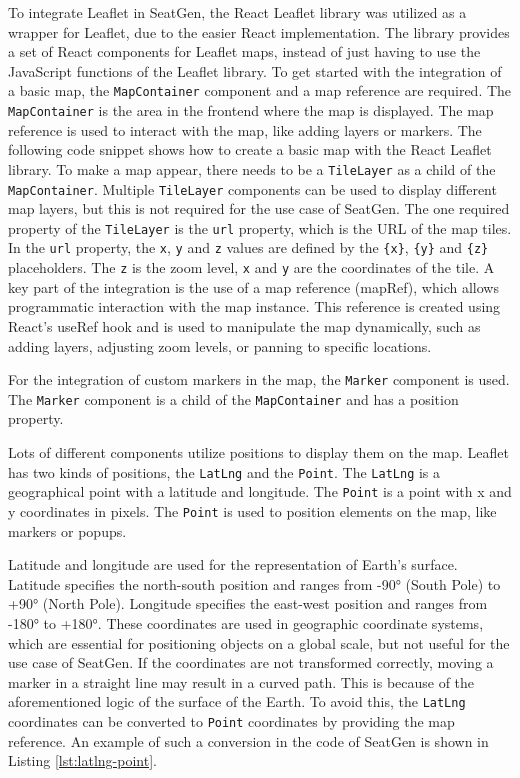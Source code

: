 To integrate Leaflet\cite{LeafletGitHub} in SeatGen, the React Leaflet library\cite{ReactLeafletDocs2} was utilized as a wrapper for Leaflet, due to the easier React implementation. The library provides a set of React components for Leaflet maps, instead of just having to use the JavaScript functions of the Leaflet library. To get started with the integration of a basic map, the \texttt{MapContainer} component and a map reference are required. The \texttt{MapContainer} is the area in the frontend where the map is displayed. The map reference is used to interact with the map, like adding layers or markers. The following code snippet shows how to create a basic map with the React Leaflet library. To make a map appear, there needs to be a \texttt{TileLayer} as a child of the \texttt{MapContainer}. Multiple \texttt{TileLayer} components can be used to display different map layers, but this is not required for the use case of SeatGen. The one required property of the \texttt{TileLayer} is the \texttt{url} property, which is the URL of the map tiles. In the \texttt{url} property, the \texttt{x}, \texttt{y} and \texttt{z} values are defined by the \texttt{\{x\}}, \texttt{\{y\}} and \texttt{\{z\}} placeholders. The \texttt{z} is the zoom level, \texttt{x} and \texttt{y} are the coordinates of the tile. A key part of the integration is the use of a map reference (mapRef), which allows programmatic interaction with the map instance. This reference is created using React’s useRef hook and is used to manipulate the map dynamically, such as adding layers, adjusting zoom levels, or panning to specific locations.

For the integration of custom markers in the map, the \texttt{Marker} component is used. The \texttt{Marker} component is a child of the \texttt{MapContainer} and has a position property.

Lots of different components utilize positions to display them on the map. Leaflet has two kinds of positions, the \texttt{LatLng} and the \texttt{Point}. The \texttt{LatLng} is a geographical point with a latitude and longitude. The \texttt{Point} is a point with x and y coordinates in pixels. The \texttt{Point} is used to position elements on the map, like markers or popups. 

Latitude and longitude are used for the representation of Earth's surface. Latitude specifies the north-south position and ranges from -90° (South Pole) to +90° (North Pole). Longitude specifies the east-west position and ranges from -180° to +180°. These coordinates are used in geographic coordinate systems, which are essential for positioning objects on a global scale, but not useful for the use case of SeatGen. If the coordinates are not transformed correctly, moving a marker in a straight line may result in a curved path. This is because of the aforementioned logic of the surface of the Earth. To avoid this, the \texttt{LatLng} coordinates can be converted to \texttt{Point} coordinates by providing the map reference. An example of such a conversion in the code of SeatGen is shown in Listing \ref{lst:latlng-point}.


